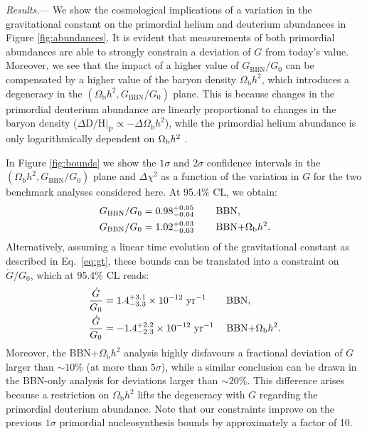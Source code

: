 \documentclass[notitlepage,twocolumn,letterpaper,natbib,aps,prl,amsmath,amsfonts,nofootinbib,preprintnumbers,superscriptaddress,secnumarabic,groupedaddress]{revtex4-1}
\begin{document}
\emph{Results.}--- We show the cosmological implications of a variation in the gravitational constant on the primordial helium and deuterium abundances in Figure \ref{fig:abundances}. It is evident that measurements of both primordial abundances are able to strongly constrain a deviation of $G$ from today's value. Moreover, we see that the impact of a higher value of $G_\mathrm{BBN}/G_0$ can be compensated by a higher value of the baryon density $\Omega_\mathrm{b}h^2$, which introduces a degeneracy in the $(\Omega_{\mathrm{b}}h^2, G_{\mathrm{BBN}}/G_0)$ plane.
This is because changes in the primordial deuterium abundance are linearly proportional to changes in the baryon density ($\Delta \mathrm{D}/\mathrm{H}|_\mathrm{P} \propto -\Delta\Omega_\mathrm{b}h^2$), while the primordial helium abundance is only logarithmically dependent on $\Omega_{\rm b} h^2$ \cite{Pitrou:2018cgg}.
\setlength\parskip{0pt}

In Figure \ref{fig:bounds} we show the $1\sigma$ and $2\sigma$ confidence intervals in the $(\Omega_{\mathrm{b}}h^2, G_{\mathrm{BBN}}/G_0)$ plane and $\Delta\chi^2$ as a function of the variation in $G$ for the two benchmark analyses considered here. At 95.4\% CL, we obtain:
\begin{align}
G_\mathrm{BBN}/G_0 &= 0.98^{+0.05}_{-0.04}\,  \qquad \text{BBN}, \\
G_\mathrm{BBN}/G_0 &= 1.02^{+0.03}_{-0.03}\,  \qquad\text{BBN+}\Omega_{\rm b}h^2.
\end{align}
Alternatively, assuming a linear time evolution of the gravitational constant as described in Eq.~\eqref{eq:gt}, these bounds can be translated into a constraint on $\dot{G}/G_0$, which at 95.4\% CL reads:
\begin{align}
\frac{\dot{G}}{G_0} &=  1.4^{+3.1}_{-3.3}\times 10^{-12}\,\, \mathrm{yr}^{-1} \qquad\text{BBN}, \\
\frac{\dot{G}}{G_0} &= -1.4^{+2.2}_{-2.3}\times 10^{-12}\,\, \mathrm{yr}^{-1} \quad\hspace{2.4pt}\text{BBN+}\Omega_{\rm b}h^2.
\end{align}
Moreover, the BBN+$\Omega_\mathrm{b}h^2$ analysis highly disfavours a fractional deviation of $G$ larger than ${\sim}10\%$ (at more than $5\sigma$), while a similar conclusion can be drawn in the BBN-only analysis for deviations larger than ${\sim}20\%$. This difference arises because a restriction on $\Omega_\mathrm{b}h^2$ lifts the degeneracy with $G$ regarding the primordial deuterium abundance. Note that our constraints improve on the previous $1\sigma$ primordial nucleosynthesis bounds \cite{Copi:2003xd, Clifton:2005xr} by approximately a factor of 10.
\setlength\parskip{10pt}
\end{document}
